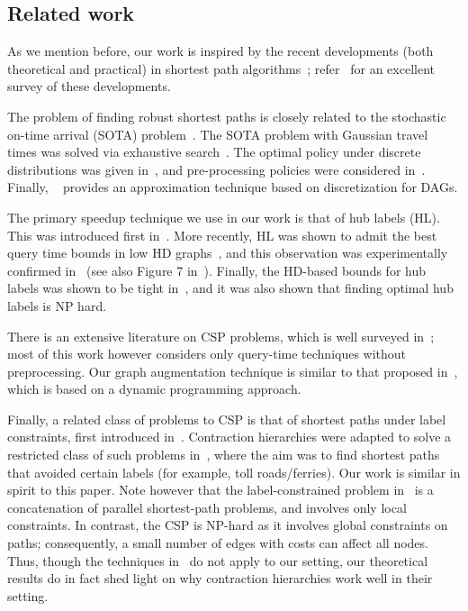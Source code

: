 \subsection{Related work}

As we mention before, our work is inspired by the recent developments (both theoretical and practical) in shortest path algorithms~\cite{highway2013,hubimplem,highway2010,dimacs09,geisberger_ch_definition,skeleton}; refer~\cite{goldberg_survey} for an excellent survey of these developments. 


The problem of finding robust shortest paths is closely related to the stochastic on-time arrival (SOTA) problem~\cite{fan2005arriving}.
The SOTA problem with Gaussian travel times was solved via exhaustive search~\cite{nikolova_gaussian}. The optimal policy under discrete distributions was given in~\cite{samaranayake2012speedup}, and pre-processing policies were considered in~\cite{sabran2014precomputation}. Finally, ~\cite{nikolova_discretization} provides an approximation technique based on discretization for DAGs.

The primary speedup technique we use in our work is that of hub labels (HL). This was introduced first in~\cite{cohen_definition_hl}. More recently, HL was shown to admit the best query time bounds in low HD graphs~\cite{highway2013,highway2010}, and this observation was experimentally confirmed in~\cite{hubimplem} (see also Figure 7 in~\cite{goldberg_survey}).  
Finally, the HD-based bounds for hub labels was shown to be tight in~\cite{babenko_hl_complexity,white_complexity_hd}, and it was also shown that finding optimal hub labels is NP hard.

There is an extensive literature on CSP problems, which is well surveyed in~\cite{csp_survey}; most of this work however considers only query-time techniques without preprocessing. Our graph augmentation technique is similar to that proposed in~\cite{alex_bicriteria}, which is based on a dynamic programming approach. 

Finally, a related class of problems to CSP is that of shortest paths under label constraints, first introduced in~\cite{language_csp}. Contraction hierarchies were adapted to solve a restricted class of such problems in~\cite{rice_csp}, where the aim was to find shortest paths that avoided certain labels (for example, toll roads/ferries). Our work is similar in spirit to this paper. Note however that the label-constrained problem in~\cite{rice_csp} is a concatenation of parallel shortest-path problems, and involves only local constraints. 
In contrast, the CSP is NP-hard as it involves global constraints on paths; consequently, a small number of edges with costs can affect all nodes. Thus, though the techniques in~\cite{rice_csp} do not apply to our setting, our theoretical results do in fact shed light on why contraction hierarchies work well in their setting.



